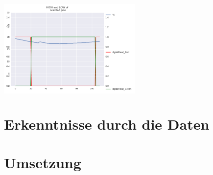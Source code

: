 \documentclass{article}
\begin{document}
\begin{center}
\includegraphics[width=0.53\textwidth]{digitalRead.png}
\end{center}

\section{Erkenntnisse durch die Daten}

\section{Umsetzung}
\end{document}
